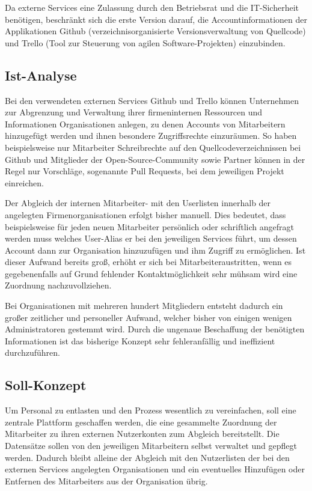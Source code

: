 Da externe Services eine Zulassung durch den Betriebsrat und die IT-Sicherheit benötigen, beschränkt
sich die erste Version darauf, die Accountinformationen der Applikationen Github
(verzeichnisorganisierte Versionsverwaltung von Quellcode) und Trello (Tool zur Steuerung von
agilen Software-Projekten) einzubinden.

\subsection{Ist-Analyse}
\label{sec:Ist-Analyse}
Bei den verwendeten externen Services Github und Trello können Unternehmen zur Abgrenzung und
Verwaltung ihrer firmeninternen Ressourcen und Informationen Organisationen anlegen, zu
denen Accounts von Mitarbeitern hinzugefügt werden und ihnen besondere Zugriffsrechte einzuräumen.
So haben beispielsweise nur Mitarbeiter Schreibrechte auf den Quellcodeverzeichnissen bei Github und
Mitglieder der Open-Source-Community sowie Partner können in der Regel nur Vorschläge, sogenannte
Pull Requests, bei dem jeweiligen Projekt einreichen.

Der Abgleich der internen Mitarbeiter- mit den Userlisten innerhalb der angelegten Firmenorganisationen
erfolgt bisher manuell. Dies bedeutet, dass beispielsweise für jeden neuen
Mitarbeiter persönlich oder schriftlich angefragt werden muss welches User-Alias er bei den
jeweiligen Services führt, um dessen Account dann zur Organisation hinzuzufügen und ihm
Zugriff zu ermöglichen. Ist dieser Aufwand bereits groß, erhöht er sich bei Mitarbeiteraustritten,
wenn es gegebenenfalls auf Grund fehlender Kontaktmöglichkeit sehr mühsam wird eine Zuordnung
nachzuvollziehen.

Bei Organisationen mit mehreren hundert Mitgliedern entsteht dadurch ein großer zeitlicher und
personeller Aufwand, welcher bisher von einigen wenigen Administratoren gestemmt wird. Durch die
ungenaue Beschaffung der benötigten Informationen ist das bisherige Konzept sehr fehleranfällig und
ineffizient durchzuführen.

\subsection{Soll-Konzept}
\label{sec:Soll-Konzept}
Um Personal zu entlasten und den Prozess wesentlich zu vereinfachen, soll eine
zentrale Plattform geschaffen werden, die eine gesammelte Zuordnung der Mitarbeiter zu ihren
externen Nutzerkonten zum Abgleich bereitstellt. Die Datensätze sollen von den jeweiligen
Mitarbeitern selbst verwaltet und gepflegt werden. Dadurch bleibt alleine der Abgleich mit den
Nutzerlisten der bei den externen Services angelegten Organisationen und ein eventuelles Hinzufügen
oder Entfernen des Mitarbeiters aus der Organisation übrig.

